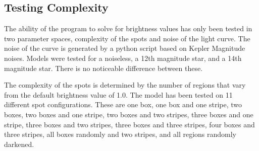 

\subsection{Testing Complexity \label{complexity}}
The ability of the program to solve for brightness values has only been tested in two parameter spaces, complexity of the spots and noise of the light curve. The noise of the curve is generated by a python script based on Kepler Magnitude noises. Models were tested for a noiseless, a 12th magnitude star, and a 14th magnitude star. There is no noticeable difference between these.

The complexity of the spots is determined by the number of regions that vary from the default brightness value of 1.0. The model has been tested on 11 different spot configurations. These are one box, one box and one stripe, two boxes, two boxes and one stripe, two boxes and two stripes, three boxes and one stripe, three boxes and two stripes, three boxes and three stripes, four boxes and three stripes, all boxes randomly and two stripes, and all regions randomly darkened.